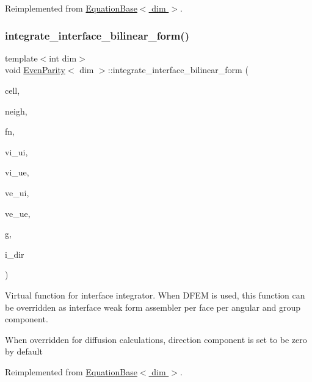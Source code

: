 Reimplemented from \hyperlink{class_equation_base_ae8472f5c20d76c7d01e5660f8377887e}{Equation\+Base$<$ dim $>$}.

\mbox{\label{class_even_parity_a0a6674c14f34f22c8ff383aee81ffabf}} 
\subsubsection{\texorpdfstring{integrate\+\_\+interface\+\_\+bilinear\+\_\+form()}{integrate\_interface\_bilinear\_form()}}
{\footnotesize\ttfamily template$<$int dim$>$ \\
void \hyperlink{class_even_parity}{Even\+Parity}$<$ dim $>$\+::integrate\+\_\+interface\+\_\+bilinear\+\_\+form (\begin{DoxyParamCaption}\item[{typename Do\+F\+Handler$<$ dim $>$\+::active\+\_\+cell\+\_\+iterator \&}]{cell,  }\item[{typename Do\+F\+Handler$<$ dim $>$\+::cell\+\_\+iterator \&}]{neigh,  }\item[{unsigned int \&}]{fn,  }\item[{Full\+Matrix$<$ double $>$ \&}]{vi\+\_\+ui,  }\item[{Full\+Matrix$<$ double $>$ \&}]{vi\+\_\+ue,  }\item[{Full\+Matrix$<$ double $>$ \&}]{ve\+\_\+ui,  }\item[{Full\+Matrix$<$ double $>$ \&}]{ve\+\_\+ue,  }\item[{const unsigned int \&}]{g,  }\item[{const unsigned int \&}]{i\+\_\+dir }\end{DoxyParamCaption})\hspace{0.3cm}{\ttfamily [virtual]}}



Virtual function for interface integrator. When D\+F\+EM is used, this function can be overridden as interface weak form assembler per face per angular and group component. 

When overridden for diffusion calculations, direction component is set to be zero by default 

Reimplemented from \hyperlink{class_equation_base_af56caa04c80d8f388e116307930d0063}{Equation\+Base$<$ dim $>$}.

